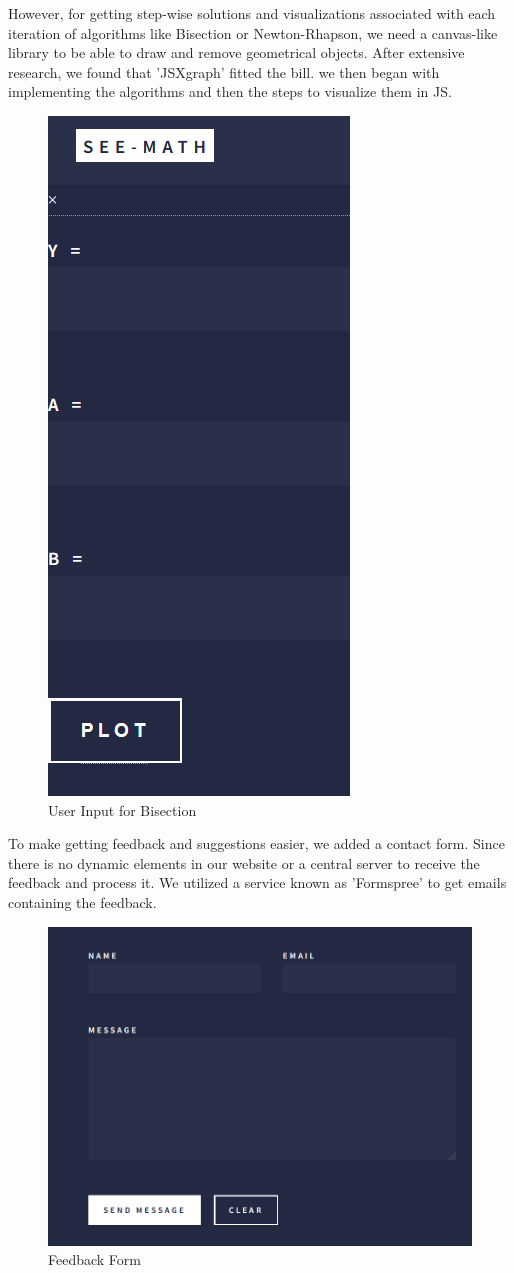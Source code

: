 However, for getting step-wise solutions and visualizations associated with each iteration of algorithms like Bisection or Newton-Rhapson, we need a canvas-like library to be able to draw and remove geometrical objects. After extensive research, we found that 'JSXgraph' fitted the bill. we then began with implementing the algorithms and then the steps to visualize them in JS.

\begin{figure}[h!]
	\centering
	\includegraphics[width=0.25\linewidth]{seemath4}
	\caption{User Input for Bisection}
\end{figure}

To make getting feedback and suggestions easier, we added a contact form. Since there is no dynamic elements in our website or a central server to receive the feedback and process it. We utilized a service known as 'Formspree'\cite{form} to get emails containing the feedback.

\begin{figure}[h!]
	\centering
	\includegraphics[width=0.5\linewidth]{seemath5}
	\caption{Feedback Form}
\end{figure}
